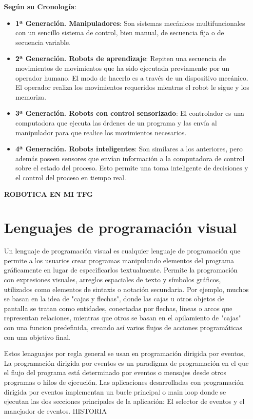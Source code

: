 \textbf{Según su Cronología}:
\begin{itemize}
\item \textbf{1ª Generación. Manipuladores}: Son sistemas mecánicos multifuncionales con un sencillo sistema de control, bien manual, de secuencia fija o de secuencia variable.

\item \textbf{2ª Generación. Robots de aprendizaje}: Repiten una secuencia de movimientos de movimientos que ha sido ejecutada previamente por un operador humano. El modo de hacerlo es a través de un dispositivo mecánico. El operador realiza los movimientos requeridos mientras el robot le sigue y los memoriza.

\item \textbf{3ª Generación. Robots con control sensorizado}: El controlador es una computadora que ejecuta las órdenes de un programa y las envía al manipulador para que realice los movimientos necesarios.

\item \textbf{4ª Generación. Robots inteligentes}: Son similares a los anteriores, pero además poseen sensores que envían información a la computadora de control sobre el estado del proceso. Esto permite una toma inteligente de decisiones y el control del proceso en tiempo real.
\end{itemize}

\textbf{ROBOTICA EN MI TFG}


\section{Lenguajes de programación visual}
\label{sec:lenguajes}

Un lenguaje de programación visual es cualquier lenguaje de programación que permite a los usuarios crear programas manipulando elementos del programa gráficamente en lugar de especificarlos textualmente. Permite la programación con expresiones visuales, arreglos espaciales de texto y símbolos gráficos, utilizados como elementos de sintaxis o notación secundaria. Por ejemplo, muchos se basan en la idea de "cajas y flechas", donde las cajas u otros objetos de pantalla se tratan como entidades, conectadas por flechas, líneas o arcos que representan relaciones, mientras que otros se basan en el apilamiento de "cajas" con una funcion predefinida, creando así varios flujos de acciones programáticas con una objetivo final.

Estos lenaguajes por regla general se usan en programación dirigida por eventos, La programación dirigida por eventos es un paradigma de programación en el que el flujo del programa está determinado por eventos o mensajes desde otros programas o hilos de ejecución.
Las aplicaciones desarrolladas con programación dirigida por eventos implementan un bucle principal o main loop donde se ejecutan las dos secciones principales de la aplicación: El selector de eventos y el manejador de eventos.
HISTORIA


